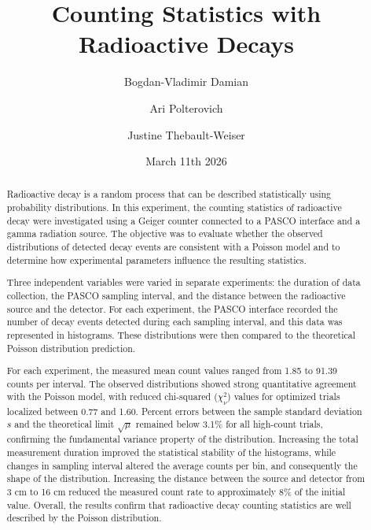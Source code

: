\documentclass[letterpaper,12pt]{article}
\title{Counting Statistics with Radioactive Decays}
\author[1]{Bogdan-Vladimir Damian}
\author[1]{Ari Polterovich}
\author[1]{Justine Thebault-Weiser}
\affil[1]{McGill University Physics Department, 3600 Rue University, H3A 2T8 Montréal, Canada}
\date{March 11th 2026}
\begin{document}
\maketitle %


\begin{abstract}
Radioactive decay is a random process that can be described statistically using probability distributions. In this experiment, the counting statistics of radioactive decay were investigated using a Geiger counter connected to a PASCO interface and a gamma radiation source. The objective was to evaluate whether the observed distributions of detected decay events are consistent with a Poisson model and to determine how experimental parameters influence the resulting statistics. 

Three independent variables were varied in separate experiments: the duration of data collection, the PASCO sampling interval, and the distance between the radioactive source and the detector. For each experiment, the PASCO interface recorded the number of decay events detected during each sampling interval, and this data was represented in histograms. These distributions were then compared to the theoretical Poisson distribution prediction. 

For each experiment, the measured mean count values ranged from 1.85 to 91.39 counts per interval. The observed distributions showed strong quantitative agreement with the Poisson model, with reduced chi-squared ($\chi^2_\nu$) values for optimized trials localized between 0.77 and 1.60. Percent errors between the sample standard deviation $s$ and the theoretical limit $\sqrt{\mu}$ remained below 3.1\% for all high-count trials, confirming the fundamental variance property of the distribution. Increasing the total measurement duration improved the statistical stability of the histograms, while changes in sampling interval altered the average counts per bin, and consequently the shape of the distribution. Increasing the distance between the source and detector from 3 cm to 16 cm reduced the measured count rate to approximately 8\% of the initial value. Overall, the results confirm that radioactive decay counting statistics are well described by the Poisson distribution.
\vspace{0.2cm}

\end{abstract}
\end{document}
